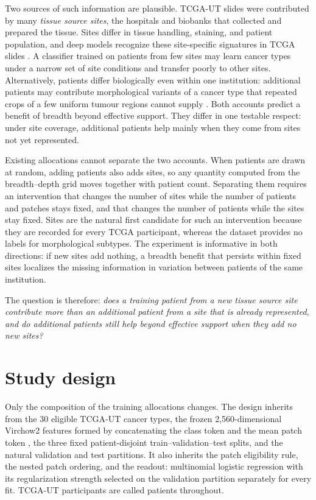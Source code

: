 \documentclass[11pt]{article}
\begin{document}
Two sources of such information are plausible. TCGA-UT slides were contributed by many \emph{tissue source sites}, the hospitals and biobanks that collected and prepared the tissue. Sites differ in tissue handling, staining, and patient population, and deep models recognize these site-specific signatures in TCGA slides \citep{howard2021impact}. A classifier trained on patients from few sites may learn cancer types under a narrow set of site conditions and transfer poorly to other sites. Alternatively, patients differ biologically even within one institution: additional patients may contribute morphological variants of a cancer type that repeated crops of a few uniform tumour regions cannot supply \citep{komura2022universalEncoding}. Both accounts predict a benefit of breadth beyond effective support. They differ in one testable respect: under site coverage, additional patients help mainly when they come from sites not yet represented.

Existing allocations cannot separate the two accounts. When patients are drawn at random, adding patients also adds sites, so any quantity computed from the breadth--depth grid moves together with patient count. Separating them requires an intervention that changes the number of sites while the number of patients and patches stays fixed, and that changes the number of patients while the sites stay fixed. Sites are the natural first candidate for such an intervention because they are recorded for every TCGA participant, whereas the dataset provides no labels for morphological subtypes. The experiment is informative in both directions: if new sites add nothing, a breadth benefit that persists within fixed sites localizes the missing information in variation between patients of the same institution.

The question is therefore: \emph{does a training patient from a new tissue source site contribute more than an additional patient from a site that is already represented, and do additional patients still help beyond effective support when they add no new sites?}

\section{Study design}
\label{sec:design}
Only the composition of the training allocations changes. The design inherits from \citet{queisler2026effectiveSupport} the 30 eligible TCGA-UT cancer types, the frozen 2,560-dimensional Virchow2 features formed by concatenating the class token and the mean patch token \citep{zimmermann2024virchow2}, the three fixed patient-disjoint train--validation--test splits, and the natural validation and test partitions. It also inherits the patch eligibility rule, the nested patch ordering, and the readout: multinomial logistic regression with its regularization strength selected on the validation partition separately for every fit. TCGA-UT participants are called patients throughout.
\end{document}
